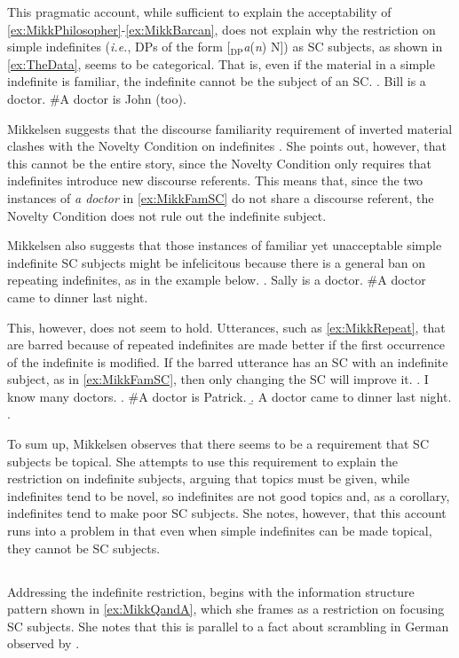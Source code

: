 \documentclass[letterpaper]{article}
\begin{document}
This pragmatic account, while sufficient to explain the acceptability of \ref{ex:MikkPhilosopher}-\ref{ex:MikkBarcan}, does not explain why the restriction on simple indefinites (\textit{i.e.}, DPs of the form [$_\text{DP}$\textit{a}(\textit{n}) N]) as SC subjects, as shown in \ref{ex:TheData}, seems to be categorical.
That is, even if the material in a simple indefinite is familiar, the indefinite cannot be the subject of an SC.
\ex.\label{ex:MikkFamSC} Bill is a doctor. \#A doctor is John (too).

Mikkelsen suggests that the discourse familiarity requirement of inverted material clashes with the Novelty Condition on indefinites \parencite{heim1982semantics}.
She points out, however, that this cannot be the entire story, since the Novelty Condition only requires that indefinites introduce new discourse referents.
This means that, since the two instances of \textit{a doctor} in \ref{ex:MikkFamSC} do not share a discourse referent, the Novelty Condition does not rule out the indefinite subject.

Mikkelsen also suggests that those instances of familiar yet unacceptable simple indefinite SC subjects might be infelicitous because there is a general ban on repeating indefinites, as in the example below.
\ex.\label{ex:MikkRepeat} Sally is a doctor. \#A doctor came to dinner last night.

This, however, does not seem to hold.
Utterances, such as \ref{ex:MikkRepeat}, that are barred because of repeated indefinites are made better if the first occurrence of the indefinite is modified.
If the barred utterance has an SC with an indefinite subject, as in \ref{ex:MikkFamSC}, then only changing the SC will improve it.
\ex.\label{ex:IndefGiven} I know many doctors.
\a. \#A doctor is Patrick.
\b. A doctor came to dinner last night.
\z.

To sum up, Mikkelsen observes that there seems to be a requirement that SC subjects be topical.
She attempts to use this requirement to explain the restriction on indefinite subjects, arguing that topics must be given, while indefinites tend to be novel, so indefinites are not good topics and, as a corollary, indefinites tend to make poor SC subjects.
She notes, however, that this account runs into a problem in that even when simple indefinites can be made topical, they cannot be SC subjects.
\subsection{\textcite{heycock2012specification}}\label{sec:Heycock}
Addressing the indefinite restriction, \textcite{heycock2012specification} begins with the information structure pattern shown in \ref{ex:MikkQandA}, which she frames as a restriction on focusing SC subjects.
She notes that this is parallel to a fact about scrambling in German observed by \textcite{lenerz1977zur}.
\end{document}
